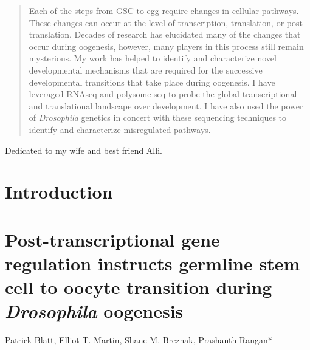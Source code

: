 \documentclass[12pt,oneside]{reedthesis}
\begin{document}
\begin{abstract}
    Each of the steps from GSC to egg require changes in cellular pathways. These changes can occur at the level of transcription, translation, or post-translation. Decades of research has elucidated many of the changes that occur during oogenesis, however, many players in this process still remain mysterious. My work has helped to identify and characterize novel developmental mechanisms that are required for the successive developmental transitions that take place during oogenesis. I have leveraged RNAseq and polysome-seq to probe the global transcriptional and translational landscape over development. I have also used the power of \emph{Drosophila} genetics in concert with these sequencing techniques to identify and characterize misregulated pathways.
  \end{abstract}
  \begin{dedication}
    Dedicated to my wife and best friend Alli.
  \end{dedication}
\mainmatter %
\pagestyle{fancyplain} %

\hypertarget{introduction}{%
\chapter*{Introduction}\label{introduction}}

















\hypertarget{post-transcriptional-gene-regulation-instructs-germline-stem-cell-to-oocyte-transition-during-drosophila-oogenesis}{%
\chapter{\texorpdfstring{Post-transcriptional gene regulation instructs germline stem cell to oocyte transition during \emph{Drosophila} oogenesis}{Post-transcriptional gene regulation instructs germline stem cell to oocyte transition during Drosophila oogenesis}}\label{post-transcriptional-gene-regulation-instructs-germline-stem-cell-to-oocyte-transition-during-drosophila-oogenesis}}

Patrick Blatt, Elliot T. Martin, Shane M. Breznak, Prashanth Rangan*
\end{document}
